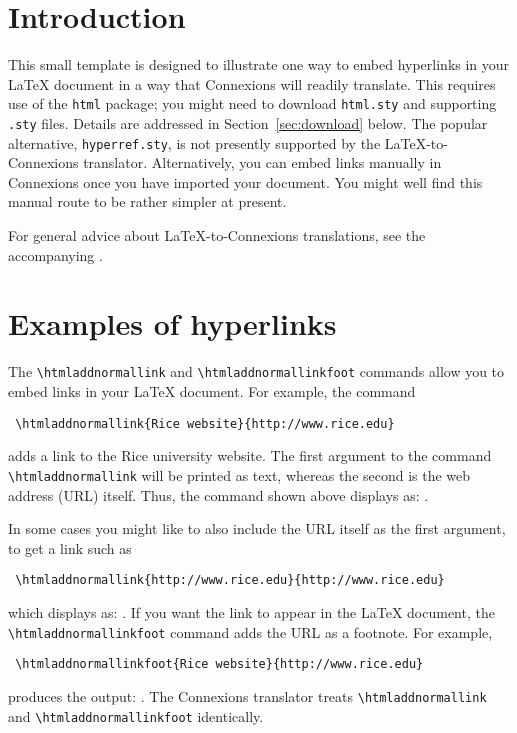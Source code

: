 \documentclass[11pt]{article}
\begin{document}
\section{Introduction}

This small template is designed to illustrate one way to embed hyperlinks
in your LaTeX document in a way that Connexions will readily translate.
This requires use of the \verb|html| package; you might need to download
\verb|html.sty| and supporting \verb|.sty| files.  
Details are addressed in Section~\ref{sec:download} below.
The popular alternative, \verb|hyperref.sty|, is not presently
supported by the LaTeX-to-Connexions translator.
Alternatively, you can embed links manually in Connexions once you
have imported your document.  You might well find this manual route 
to be rather simpler at present.

For general advice about LaTeX-to-Connexions translations, 
see the accompanying . 

\section{Examples of hyperlinks}

The \verb|\htmladdnormallink| and \verb|\htmladdnormallinkfoot| commands
allow you to embed links in your LaTeX document.
For example, the command
\begin{verbatim}
 \htmladdnormallink{Rice website}{http://www.rice.edu}
\end{verbatim}
adds a link to the Rice university website.
The first argument to the command \verb|\htmladdnormallink| will be printed 
as text, whereas the second is the web address (URL) itself.
Thus, the command shown above displays as: .

In some cases you might like to also include the URL itself as the first argument,
to get a link such as
\begin{verbatim}
 \htmladdnormallink{http://www.rice.edu}{http://www.rice.edu}
\end{verbatim}
which displays as: .
If you want the link to appear in the LaTeX document, the 
\verb|\htmladdnormallinkfoot| command adds the URL as a footnote.
For example,
\begin{verbatim}
 \htmladdnormallinkfoot{Rice website}{http://www.rice.edu}
\end{verbatim}
produces the output: .
The Connexions translator treats \verb|\htmladdnormallink|
and \verb|\htmladdnormallinkfoot| identically.
\end{document}
